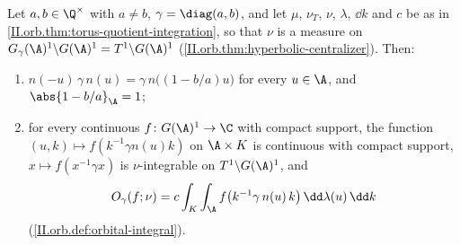 Let $a,b\in\Q^\times$ with $a\neq b$, $\gamma=\diag(a,b)$, and let $\mu$, $\nu_T$, $\nu$, $\lambda$, $\dd k$ and $c$ be as in
\cref{II.orb.thm:torus-quotient-integration}, so that $\nu$ is a measure on $G_\gamma(\A)^1\backslash G(\A)^1=T^1\backslash G(\A)^1$
(\cref{II.orb.thm:hyperbolic-centralizer}). Then:
\begin{enumerate}
  \item[(a)] $n(-u)\,\gamma\,n(u)=\gamma\,n\bigl((1-b/a)u\bigr)$ for every $u\in\A$, and $\abs{1-b/a}_\A=1$;
  \item[(b)] for every continuous $f\colon G(\A)^1\to\C$ with compact support, the function $(u,k)\mapsto f(k^{-1}\gamma n(u)k)$ on $\A\times K$ is continuous
  with compact support, $x\mapsto f(x^{-1}\gamma x)$ is $\nu$-integrable on $T^1\backslash G(\A)^1$, and
  \[
    O_\gamma(f;\nu)=c\int_K\int_\A f\bigl(k^{-1}\gamma\,n(u)\,k\bigr)\,\dd\lambda(u)\,\dd k
  \]
  (\cref{II.orb.def:orbital-integral}).
\end{enumerate}
